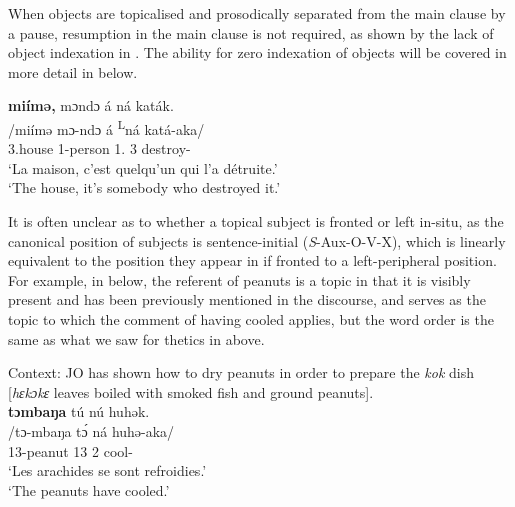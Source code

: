 \documentclass[output=paper,colorlinks,citecolor=brown
]{langscibook}
\begin{document}
\z

When objects are topicalised and prosodically separated from the main clause by a pause, resumption in the main clause is not required, as shown by the lack of object indexation in . The ability for zero indexation of objects will be covered in more detail in  below.

\ea
\label{housetop}
\glll
{\db}\textbf{miímə,}	mɔndɔ	á \ds{}ná	katák. \\
/miímə	mɔ-ndɔ	á \textsuperscript{L}ná	katá-aka/ \\
{\db}3.house	1-person	1\SM{}.\REL{} \PST{}3{} destroy-\DUR{} \\
\glt
`La maison, c'est quelqu'un qui l'a détruite.' \\ `The house, it's somebody who destroyed it.' \jambox*{[EB+JO 2692] }

\z


It is often unclear as to whether a topical subject is fronted or left in-situ, as the canonical position of subjects is sentence-initial (\textit{S}-Aux-O-V-X), which is linearly equivalent to the position they appear in if fronted to a left-peripheral position. For example, in  below, the referent of peanuts is a topic in that it is visibly present and has been previously mentioned in the discourse, and serves as the topic to which the comment of having cooled applies, but the word order is the same as what we saw for thetics in  above.

\ea
\label{peanuttop}
Context: JO has shown how to dry peanuts in order to prepare the \textit{kok} dish [\textit{hɛkɔkɛ} leaves boiled
with smoked fish and ground peanuts]. \\ 
\glll
{\db}\textbf{tɔmbaŋa} tú nú huhək. \\
/tɔ-mbaŋa tɔ́ ná huhə-aka/ \\
{\db}13-peanut 13\SM{} \PST{}2{} cool-\DUR{} \\
\glt
`Les arachides se sont refroidies.' \\ `The peanuts have cooled.' \jambox*{[JO 1358] }

\z
\end{document}
